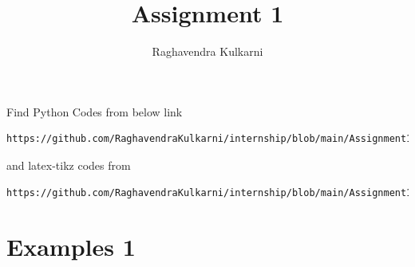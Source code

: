 \documentclass[journal,12pt,twocolumn]{IEEEtran}
\begin{document}
\providecommand{\fourier}{\overset{\mathcal{F}}{ \rightleftharpoons}}
\providecommand{\system}{\overset{\mathcal{H}}{ \longleftrightarrow}}
\newcommand{\solution}{\noindent \textbf{Solution: }}
\newcommand{\cosec}{\,\text{cosec}\,}
\providecommand{\dec}[2]{\ensuremath{\overset{#1}{\underset{#2}{\gtrless}}}}
\newcommand{\myvec}[1]{\ensuremath{\begin{pmatrix}#1\end{pmatrix}}}
\newcommand{\mydet}[1]{\ensuremath{\begin{vmatrix}#1\end{vmatrix}}}
\makeatletter
{}
\makeatother
\let\StandardTheFigure\thefigure
\let\vec\mathbf
\renewcommand{\thefigure}{\theproblem}
\def\putbox#1#2#3{\makebox[0in][l]{\makebox[#1][l]{}\raisebox{\baselineskip}[0in][0in]{\raisebox{#2}[0in][0in]{#3}}}}
     \def\rightbox#1{\makebox[0in][r]{#1}}
     \def\centbox#1{\makebox[0in]{#1}}
     \def\topbox#1{\raisebox{-\baselineskip}[0in][0in]{#1}}
     \def\midbox#1{\raisebox{-0.5\baselineskip}[0in][0in]{#1}}
\vspace{3cm}
\title{Assignment 1}
\author{Raghavendra Kulkarni}
\maketitle
\newpage
\bigskip
\renewcommand{\thefigure}{\theenumi}
\renewcommand{\thetable}{\theenumi}
Find Python Codes from below link 
%
\begin{lstlisting}
https://github.com/RaghavendraKulkarni/internship/blob/main/Assignment1/Assignment1.py
\end{lstlisting}
%
and latex-tikz codes from 
%
\begin{lstlisting}
https://github.com/RaghavendraKulkarni/internship/blob/main/Assignment1/assignment1.tex
\end{lstlisting}
%
\section{Examples 1}
\end{document}
